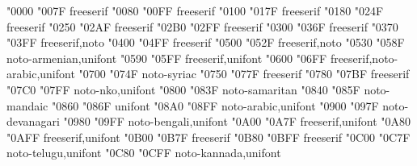 \documentclass{article}
\begin{document}
                    {  "0000} {  "007F} {freeserif}
             {  "0080} {  "00FF} {freeserif}
                               {  "0100} {  "017F} {freeserif}
                               {  "0180} {  "024F} {freeserif}
                                 {  "0250} {  "02AF} {freeserif}
                       {  "02B0} {  "02FF} {freeserif}
                    {  "0300} {  "036F} {freeserif}
                               {  "0370} {  "03FF} {freeserif,noto}
                                       {  "0400} {  "04FF} {freeserif}
                            {  "0500} {  "052F} {freeserif,noto}
                                       {  "0530} {  "058F} {noto-armenian,unifont}
                                         {  "0590} {  "05FF} {freeserif,unifont}
                                         {  "0600} {  "06FF} {freeserif,noto-arabic,unifont}
                                         {  "0700} {  "074F} {noto-syriac}
                              {  "0750} {  "077F} {freeserif}
                                         {  "0780} {  "07BF} {freeserif}
                                            {  "07C0} {  "07FF} {noto-nko,unifont}
                                      {  "0800} {  "083F} {noto-samaritan}
                                        {  "0840} {  "085F} {noto-mandaic}
                              {  "0860} {  "086F} {unifont}
                              {  "08A0} {  "08FF} {noto-arabic,unifont}
                                     {  "0900} {  "097F} {noto-devanagari}
                                        {  "0980} {  "09FF} {noto-bengali,unifont}
                                       {  "0A00} {  "0A7F} {freeserif,unifont}
                                       {  "0A80} {  "0AFF} {freeserif,unifont}
                                          {  "0B00} {  "0B7F} {freeserif}
                                          {  "0B80} {  "0BFF} {freeserif}
                                         {  "0C00} {  "0C7F} {noto-telugu,unifont}
                                        {  "0C80} {  "0CFF} {noto-kannada,unifont}
\end{document}
